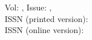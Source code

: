 






\noindent Vol: \emindsVolumeCount, Issue: \emindsVolumeNumber, \emindsVolumeDate \\
\noindent ISSN (printed version): \emindsISSNprinted \\
\noindent ISSN (online version): \emindsISSNonline \\

{\footnotesize

}

